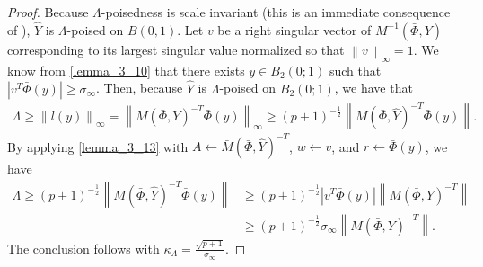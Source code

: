 \documentclass{article}
\begin{document}

\begin{proof}
Because $\Lambda$-poisedness is scale invariant (this is an immediate consequence of \cite[Lemma 3.8]{introduction_book}), 
$\hat Y$ is $\Lambda$-poised on $B(0, 1)$.
Let $v$ be a right singular vector of $M^{-1}\left(\bar \Phi, Y\right)$ 
corresponding to its largest singular value normalized so that $\left\|v\right\|_{\infty} = 1$.
We know from \cref{lemma_3_10} that there exists $y \in B_2\left(0; 1\right)$ such that
$\left| v^T \bar {\Phi}(y) \right| \ge {\sigma_{\infty}}$.
Then, because $\hat Y$ is $\Lambda$-poised on $B_2(0; 1)$, we have that 
\begin{align*}
\Lambda 
\ge \left\|l(y)\right\|_{\infty} 
= \left\|M\left(\bar \Phi, Y\right)^{-T} \bar \Phi(y)\right\|_{\infty}
\ge \left(p+1\right)^{-\frac1 2 }\left\|M\left(\bar \Phi, \hat Y\right)^{-T} \bar{\Phi}(y)\right\|.
\end{align*}
By applying \cref{lemma_3_13} with $A\gets{\bar M}\left(\bar \Phi, \hat Y\right)^{-T}$, $w \gets v$, and $r \gets \bar \Phi(y)$, we have
\begin{align*}
\Lambda 
\ge \left(p+1\right)^{-\frac1 2 }\left\|M\left(\bar \Phi, \hat Y\right)^{-T} \bar{\Phi}(y)\right\|
&\ge \left(p+1\right)^{-\frac1 2 }|v^T \bar \Phi(y)| \left\|M\left(\bar \Phi, Y\right)^{-T}\right\| \\
&\ge \left(p+1\right)^{-\frac1 2 }\sigma_{\infty} \left\|M\left(\bar \Phi, Y\right)^{-T}\right\|.
\end{align*}
The conclusion follows with $\kappa_{\Lambda} = \frac {\sqrt{p+1}}{\sigma_{\infty}}$.

\end{proof}
\end{document}
